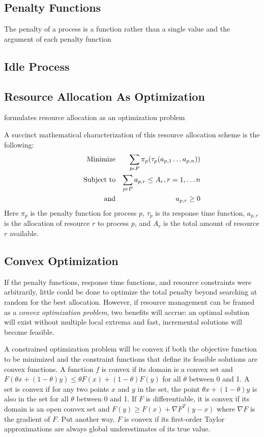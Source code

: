 \subsection*{Penalty Functions}


The penalty of a process is a function rather than a single value
    and the argument of each penalty function
    
    
\subsection*{Idle Process}    

\subsection*{Resource Allocation As Optimization}
\pacora formulates resource allocation as an optimization problem 


A succinct mathematical characterization of this resource allocation scheme is the following:
\begin{eqnarray*}
& \makebox[1in][r]{Minimize}   & \sum_{p\epsilon P} {\pi_p(\tau_p(a_{p,1}\ldots a_{p,n}))}  \\
& \makebox[1in][r]{Subject to} & \sum_{p\epsilon P} a_{p,r} \leq A_r, r = 1,\ldots n        \\
& \makebox[1in][r]{and}        & a_{p,r} \geq 0
\end{eqnarray*}
Here $\pi_p$ is the penalty function for process $p$,
$\tau_p$ is its response time function,
$a_{p,r}$ is the allocation of resource $r$ to process $p$,
and $A_r$ is the total amount of resource $r$ available.


\subsection*{Convex Optimization}
If the penalty functions, response time functions, and resource constraints were arbitrarily,
little could be done to optimize the total penalty beyond searching at random for the best allocation.
However, if resource management can be framed as a \emph{convex optimization problem}\cite{BoVa},
two benefits will accrue: an optimal solution will exist without multiple local extrema and
fast, incremental solutions will become feasible.

A constrained optimization problem will be convex if both the objective function to be minimized
and the constraint functions that define its feasible solutions are convex functions.
A function $f$ is convex if its domain is a convex set and
$F(\theta x + (1-\theta)y) \leq \theta F(x) + (1-\theta)F(y)$
for all $\theta$ between 0 and 1.
A set is convex if for any two points $x$ and $y$ in the set, the point
$\theta x + (1-\theta)y$
is also in the set for all $\theta$ between 0 and 1.
If $F$ is differentiable, it is convex if its domain is an open convex set and
$F(y) \geq F(x) + \nabla F^T(y-x)$ where $\nabla F$ is the gradient of $F$.
Put another way, $F$ is convex if its first-order Taylor approximations
are always global underestimates of its true value.

